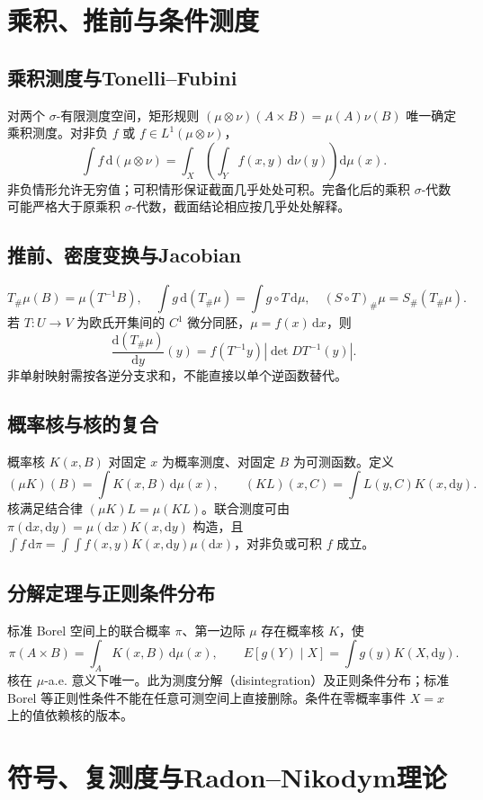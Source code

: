 \documentclass[../main.tex]{subfiles}
\begin{document}
\section{乘积、推前与条件测度}
\subsection{乘积测度与Tonelli--Fubini}
对两个 $\sigma$-有限测度空间，矩形规则 $(\mu\otimes\nu)(A\times B)=\mu(A)\nu(B)$ 唯一确定乘积测度。对非负 $f$ 或 $f\in L^1(\mu\otimes\nu)$，
\[
\int f\,\mathrm d(\mu\otimes\nu)
=\int_X\left(\int_Yf(x,y)\,\mathrm d\nu(y)\right)\mathrm d\mu(x).
\]
非负情形允许无穷值；可积情形保证截面几乎处处可积。完备化后的乘积 $\sigma$-代数可能严格大于原乘积 $\sigma$-代数，截面结论相应按几乎处处解释。
\subsection{推前、密度变换与Jacobian}
\[
T_\#\mu(B)=\mu(T^{-1}B),\quad
\int g\,\mathrm d(T_\#\mu)=\int g\circ T\,\mathrm d\mu,\quad
(S\circ T)_\#\mu=S_\#(T_\#\mu).
\]
若 $T:U\to V$ 为欧氏开集间的 $C^1$ 微分同胚，$\mu=f(x)\,\mathrm dx$，则
\[
\frac{\mathrm d(T_\#\mu)}{\mathrm dy}(y)
=f(T^{-1}y)|\det DT^{-1}(y)|.
\]
非单射映射需按各逆分支求和，不能直接以单个逆函数替代。
\subsection{概率核与核的复合}
概率核 $K(x,B)$ 对固定 $x$ 为概率测度、对固定 $B$ 为可测函数。定义
\[
(\mu K)(B)=\int K(x,B)\,\mathrm d\mu(x),\qquad
(KL)(x,C)=\int L(y,C)K(x,\mathrm dy).
\]
核满足结合律 $(\mu K)L=\mu(KL)$。联合测度可由 $\pi(\mathrm dx,\mathrm dy)=\mu(\mathrm dx)K(x,\mathrm dy)$ 构造，且 $\int f\,\mathrm d\pi=\int\int f(x,y)K(x,\mathrm dy)\mu(\mathrm dx)$，对非负或可积 $f$ 成立。
\subsection{分解定理与正则条件分布}
标准 Borel 空间上的联合概率 $\pi$、第一边际 $\mu$ 存在概率核 $K$，使
\[
\pi(A\times B)=\int_AK(x,B)\,\mathrm d\mu(x),\qquad
E[g(Y)\mid X]=\int g(y)K(X,\mathrm dy).
\]
核在 $\mu$-a.e. 意义下唯一。此为测度分解（disintegration）及正则条件分布；标准 Borel 等正则性条件不能在任意可测空间上直接删除。条件在零概率事件 $X=x$ 上的值依赖核的版本。
\section{符号、复测度与Radon--Nikodym理论}
\end{document}
